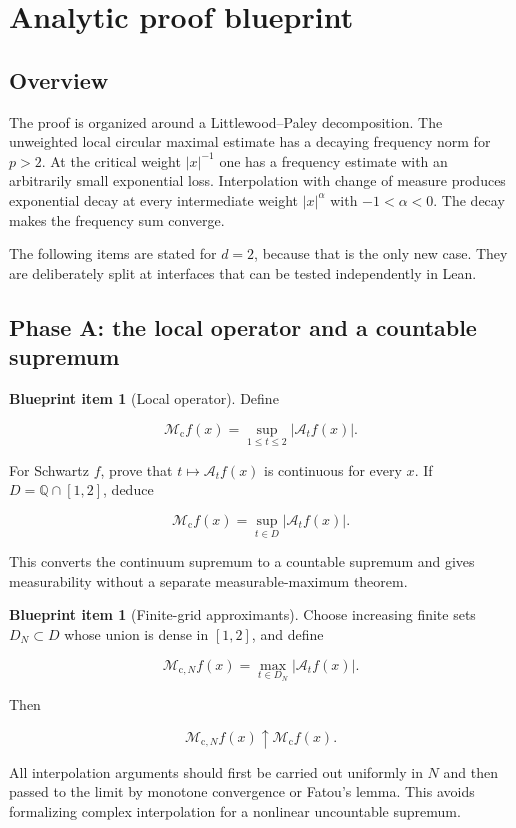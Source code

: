 \documentclass[11pt,a4paper]{article}
\theoremstyle{definition}
\newtheorem{blueprint}[theorem]{Blueprint item}
\theoremstyle{remark}
\newcommand{\Mc}{\mathcal{M}_{\mathrm{c}}}
\newcommand{\A}{\mathcal{A}}
\newcommand{\abs}[1]{\left\lvert #1\right\rvert}
\begin{document}
\section{Analytic proof blueprint}

\subsection{Overview}

The proof is organized around a Littlewood--Paley decomposition.  The
unweighted local circular maximal estimate has a decaying frequency norm for
$p>2$.  At the critical weight $\abs{x}^{-1}$ one has a frequency estimate
with an arbitrarily small exponential loss.  Interpolation with change of
measure produces exponential decay at every intermediate weight
$\abs{x}^{\alpha}$ with $-1<\alpha<0$.  The decay makes the frequency sum
converge.

The following items are stated for $d=2$, because that is the only new case.
They are deliberately split at interfaces that can be tested independently in
Lean.

\subsection{Phase A: the local operator and a countable supremum}

\begin{blueprint}[Local operator]
Define

\[
\Mc f(x)=\sup_{1\leq t\leq2}\abs{\A_t f(x)}.
\]

For Schwartz $f$, prove that $t\mapsto\A_t f(x)$ is continuous for every $x$.
If $D=\mathbb{Q}\cap[1,2]$, deduce

\[
\Mc f(x)=\sup_{t\in D}\abs{\A_t f(x)}.
\]

This converts the continuum supremum to a countable supremum and gives
measurability without a separate measurable-maximum theorem.
\end{blueprint}

\begin{blueprint}[Finite-grid approximants]
Choose increasing finite sets $D_N\subset D$ whose union is dense in $[1,2]$,
and define

\[
\mathcal{M}_{\mathrm{c},N} f(x)=\max_{t\in D_N}\abs{\A_t f(x)}.
\]

Then

\[
\mathcal{M}_{\mathrm{c},N} f(x)\uparrow\Mc f(x).
\]

All interpolation arguments should first be carried out uniformly in $N$ and
then passed to the limit by monotone convergence or Fatou's lemma.  This avoids
formalizing complex interpolation for a nonlinear uncountable supremum.
\end{blueprint}
\end{document}
